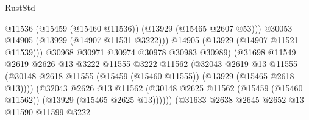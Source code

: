 \begin{lexlean}{RustStd}
\begin{coremodule}
                                                @11536
                                                (@15459 (@15460 @11536))
                                                (@13929 (@15465 @2607 @53)))
                                              @30053
                                              @14905
                                              (@13929 (@14907 @11531 @3222)))
                                            @14905
                                            (@13929 (@14907 @11521 @11539)))
                                          @30968
                                          @30971
                                          @30974
                                          @30978
                                          @30983
                                          @30989)
                                        (@31698
                                          @11549
                                          @2619
                                          @2626
                                          @13
                                          @3222
                                          @11555
                                          @3222
                                          @11562
                                          (@32043
                                            @2619
                                            @13
                                            @11555
                                            (@30148
                                              @2618
                                              @11555
                                              (@15459 (@15460 @11555))
                                              (@13929 (@15465 @2618 @13))))
                                          (@32043
                                            @2626
                                            @13
                                            @11562
                                            (@30148
                                              @2625
                                              @11562
                                              (@15459 (@15460 @11562))
                                              (@13929 (@15465 @2625 @13))))))
                                      (@31633
                                        @2638
                                        @2645
                                        @2652
                                        @13
                                        @11590
                                        @11599
                                        @3222

\end{coremodule}
\end{lexlean}
